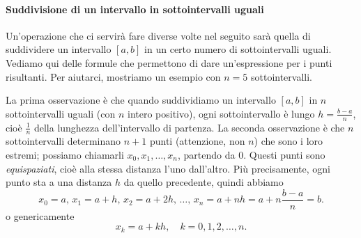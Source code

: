 \documentclass[a4paper]{report}
\theoremstyle{definiton}
\theoremstyle{remark}
\begin{document}
\paragraph{Suddivisione di un intervallo in sottointervalli uguali} Un'operazione che ci servirà fare diverse volte nel seguito sarà quella di suddividere un intervallo $[a,b]$ in un certo numero di sottointervalli uguali. Vediamo qui delle formule che permettono di dare un'espressione per i punti risultanti. Per aiutarci, mostriamo un esempio con $n=5$ sottointervalli.
\begin{center}
\end{center}

La prima osservazione è che quando suddividiamo un intervallo $[a,b]$ in $n$ sottointervalli uguali (con $n$ intero positivo), ogni sottointervallo è lungo $h = \frac{b-a}{n}$, cioè $\frac{1}{n}$ della lunghezza dell'intervallo di partenza. La seconda osservazione è che $n$ sottointervalli determinano $n+1$ punti (attenzione, non $n$) che sono i loro estremi; possiamo chiamarli $x_0, x_1,\dots, x_n$, partendo da $0$. Questi punti sono \emph{equispaziati}, cioè alla stessa distanza l'uno dall'altro. Più precisamente, ogni punto sta a una distanza $h$ da quello precedente, quindi abbiamo
\[
    x_0=a,\, x_1=a+h,\, x_2 = a+2h,\, \dots, \,x_n = a+nh = a + n\frac{b-a}{n} = b.
\]
o genericamente
\[
    x_k = a + kh, \quad k=0,1,2,\dots,n.
\]
\end{document}
